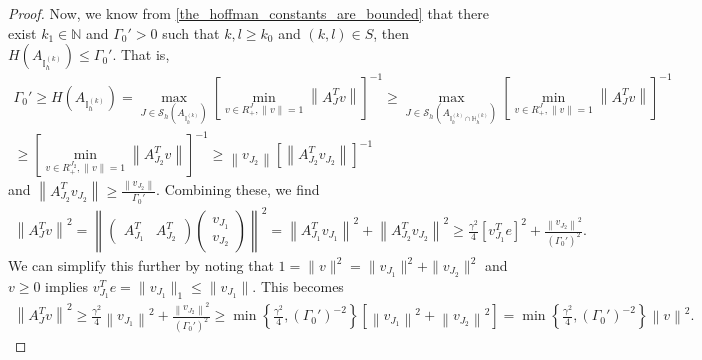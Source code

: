 \documentclass{article}
\theoremstyle{case}
\numberwithin{theorem}{subsection}
\newcommand{\huff}{{\Gamma_0}}
\newcommand{\naturals}{\mathbb N}
\newcommand{\activeindicesk}{{ \mathbb I_h^{(k)} }}
\newcommand{\huffindicesk}{{ \mathbb H_h^{(k)} }}
\begin{document}
\begin{proof}
Now, we know from \cref{the_hoffman_constants_are_bounded} that there exist $k_1 \in \naturals$ and $\huff'>0$ such that
$k,l \ge k_0$ and $(k,l) \in S$, then
$H\left(A_{\activeindicesk}\right) \le \huff'$.
That is,
\begin{align*}
\huff' \ge H\left(A_{\activeindicesk}\right)
= \max_{J \in \mathcal S_h\left(A_{\activeindicesk}\right)} \left[\min_{v \in R^J_+, \|v\| = 1}  \left\|A_J^Tv\right\| \right]^{-1}
\ge \max_{J \in \mathcal S_h\left(A_{\activeindicesk \cap \huffindicesk}\right)} \left[\min_{v \in R^J_+, \|v\| = 1}  \left\|A_J^Tv\right\| \right]^{-1} \\
\ge \left[\min_{v \in R^{J_2}_+, \|v\| = 1}  \left\|A_{J_2}^Tv\right\| \right]^{-1}
\ge \left\|v_{J_2}\right\|\left[\left\|A_{J_2}^Tv_{J_2}\right\| \right]^{-1}
\end{align*}
and $\left\|A_{J_2}^Tv_{J_2}\right\| \ge \frac{\left\|v_{J_2}\right\|}{\huff'}$.
Combining these, we find
\begin{align*}
\left\|A_J^T v\right\|^2 = 
\left\|
\begin{pmatrix}
A_{J_1}^T & A_{J_2}^T
\end{pmatrix}
\begin{pmatrix}
v_{J_1} \\ v_{J_2}
\end{pmatrix}
\right\|^2 = 
\left\| A_{J_1}^T v_{J_1}\right\|^2 + \left\| A_{J_2}^T v_{J_2}\right\|^2
\ge 
\frac {\gamma^2} {4} \left[v_{J_1}^Te\right]^2 + \frac{\left\|v_{J_2}\right\|^2}{\left(\huff'\right)^2}.
\end{align*}
We can simplify this further by noting that 
$1 = \|v\|^2 = \|v_{J_1}\|^2 + \|v_{J_2}\|^2$ and
$v \ge 0$ implies $v_{J_1}^Te = \|v_{J_1}\|_{1} \le \|v_{J_1}\|$.
This becomes 
\begin{align*}
\left\|A_J^T v\right\|^2
\ge \frac {\gamma^2} {4} \left\|v_{J_1}\right\|^2 + \frac{\left\|v_{J_2}\right\|^2}{\left(\huff'\right)^2}
\ge \min\left\{\frac {\gamma^2} {4}, \left(\huff'\right)^{-2}\right\} \left[\left\|v_{J_1}\right\|^2 + \left\|v_{J_2}\right\|^2\right]
= \min\left\{\frac {\gamma^2} {4}, \left(\huff'\right)^{-2}\right\} \left\|v\right\|^2.
\end{align*}








\end{proof}
\end{document}

